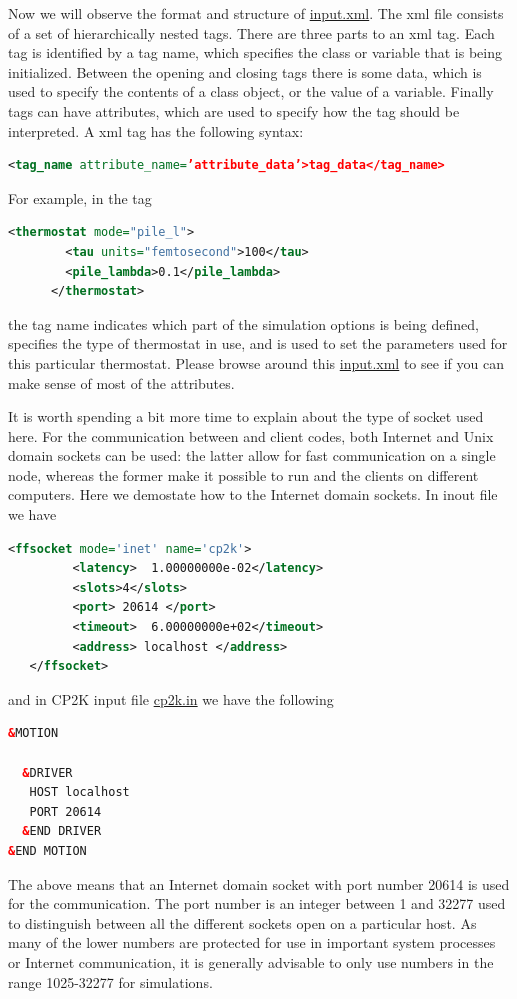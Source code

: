 \documentclass{article}
\begin{document}
\begin{Exercise}[label={basic},title={Keywords, outputs, and units of \ipi{}}]
\Question
Now we will observe the format and structure of \url{input.xml}.
The xml file consists of a set of hierarchically nested tags. There are three
parts to an xml tag. Each tag is identified by a tag name, which specifies the class
or variable that is being initialized. Between the opening and closing tags there is some data, 
which is used to specify the
contents of a class object, or the value of a variable. Finally tags can have attributes,
which are used to specify how the tag should be interpreted.
A xml tag has the following syntax:
\begin{lstlisting}[language=xml]
<tag_name attribute_name=’attribute_data’>tag_data</tag_name>
\end{lstlisting}
For example, in the tag
\begin{lstlisting}[language=xml]
      <thermostat mode="pile_l">
        <tau units="femtosecond">100</tau> 
        <pile_lambda>0.1</pile_lambda>
      </thermostat>
\end{lstlisting}
the tag name  indicates which part of the simulation options is being defined,
 specifies the type of thermostat in use,
and  is used to set the parameters used for this particular thermostat.
Please browse around this \url{input.xml} to see if you can make sense of most of the attributes.

\Question
It is worth spending a bit more time to explain about the type of socket used here.
For the communication between \ipi{} and client codes, both Internet and Unix domain sockets can be used: the
latter allow for fast communication on a single node, whereas the former make it possible
to run \ipi{} and the clients on different computers.
Here we demostate how to the Internet domain sockets.
In \ipi{} inout file we have
\begin{lstlisting}[language=xml]
    <ffsocket mode='inet' name='cp2k'>
         <latency>  1.00000000e-02</latency>
         <slots>4</slots>
         <port> 20614 </port>
         <timeout>  6.00000000e+02</timeout>
         <address> localhost </address>
   </ffsocket> 
\end{lstlisting}
and in CP2K input file \url{cp2k.in} we have the following
\begin{lstlisting}[language=xml]
&MOTION

  &DRIVER
   HOST localhost
   PORT 20614
  &END DRIVER
&END MOTION
\end{lstlisting}
The above means that an Internet domain socket with port number 20614 is used for the communication.
The port number is an integer between 1 and 32277 used to distinguish between all the
different sockets open on a particular host. As many of the lower numbers are protected
for use in important system processes or Internet communication, it is generally advisable
to only use numbers in the range 1025-32277 for simulations.


\end{Exercise}
\end{document}
